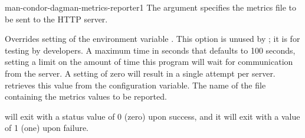 \begin{ManPage}{}{man-condor-dagman-metrics-reporter}{1}
The  argument specifies the metrics file to be sent
to the HTTP server.

\begin{Options}
     {Overrides setting of the environment variable
     . 
     This option is unused by ; it is for testing by developers.}
    {A maximum time in seconds that defaults to 100 seconds,
    setting a limit on the amount of time this program will wait for
    communication from the server.  
    A setting of zero will result in a single attempt per server. 
     retrieves this value from the 
     configuration variable.}
    {The name of the file containing the metrics values to be reported.}
\end{Options}

\ExitStatus

 will exit with a status value of 0 (zero)
 upon success,
and it will exit with a value of 1 (one) upon failure.

\end{ManPage}

